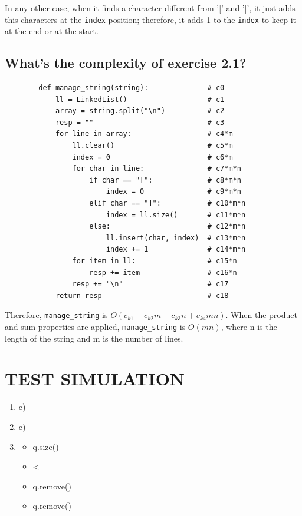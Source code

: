 \documentclass[a4paper,12pt]{article}
\begin{document}
      In any other case, when it finds a character different from '[' and ']', it just adds this characters
      at the \texttt{index} position; therefore, it adds 1 to the \texttt{index} to keep it at the end or at the start.

    \subsection{What's the complexity of exercise 2.1?}
      \begin{Verbatim}
        def manage_string(string):              # c0
            ll = LinkedList()                   # c1
            array = string.split("\n")          # c2
            resp = ""                           # c3
            for line in array:                  # c4*m
                ll.clear()                      # c5*m
                index = 0                       # c6*m
                for char in line:               # c7*m*n
                    if char == "[":             # c8*m*n
                        index = 0               # c9*m*n
                    elif char == "]":           # c10*m*n
                        index = ll.size()       # c11*m*n
                    else:                       # c12*m*n
                        ll.insert(char, index)  # c13*m*n
                        index += 1              # c14*m*n
                for item in ll:                 # c15*n
                    resp += item                # c16*n
                resp += "\n"                    # c17
            return resp                         # c18
      \end{Verbatim}
      Therefore, \texttt{manage\_string} is $O(c_{k1}+c_{k2}m+c_{k3}n+c_{k4}mn)$.
      When the product and sum properties are applied, \texttt{manage\_string} is $O(mn)$,
      where n is the length of the string and m is the number of lines.



  \section{TEST SIMULATION}
    \begin{enumerate}
      \item c)
      \item c)
      \item \begin{itemize}
        \item q.size()
        \item <=
        \item q.remove()
        \item q.remove()
    \end{itemize}
    \end{enumerate}
\end{document}
